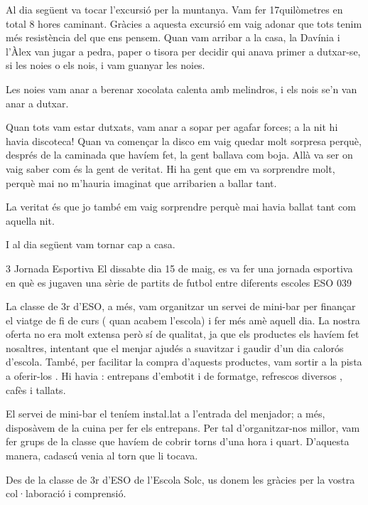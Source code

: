 \begin{news}
Al dia següent va tocar l'excursió per la muntanya. Vam fer 17quilòmetres en total 8 hores caminant. Gràcies a aquesta excursió em vaig adonar que tots tenim més resistència del que ens pensem. Quan vam arribar a la casa, la Davínia i l'Àlex van jugar a pedra, paper o tisora per decidir qui anava primer a dutxar-se, si les noies o els nois, i vam guanyar les noies. 

Les noies vam anar a berenar xocolata calenta amb melindros, i els nois se'n van anar a dutxar. 

Quan tots vam estar dutxats, vam anar a sopar per agafar forces; a la nit hi havia discoteca! Quan va començar la disco em vaig quedar molt sorpresa perquè, després de la caminada que havíem fet,  la gent ballava com boja. Allà va ser on vaig saber com és la gent de veritat. Hi ha gent que em va sorprendre molt, perquè mai no m'hauria imaginat que arribarien a ballar tant. 

La veritat és que jo també em vaig sorprendre  perquè mai havia ballat tant com aquella nit. 

I al dia següent vam tornar cap a casa.


\end{news}

\newssep
{}

\begin{news}
{3} %
{Jornada Esportiva}
{El dissabte dia 15 de maig,  es va fer una jornada esportiva en què es jugaven una sèrie de partits de futbol entre diferents escoles}
{ESO}
{039} %


La classe de 3r d’ESO, a més, vam organitzar un servei de mini-bar per finançar el viatge de fi de curs  ( quan acabem l'escola) i fer més amè aquell dia. La nostra oferta no era molt extensa però sí de qualitat, ja que els productes els havíem fet nosaltres, intentant que el menjar ajudés a suavitzar i gaudir d’un dia calorós d’escola. També, per facilitar la compra d’aquests productes, vam sortir a la pista a oferir-los . Hi havia : entrepans d'embotit i de formatge, refrescos diversos , cafès i tallats.

El servei de mini-bar el teníem instal.lat a l’entrada del menjador; a més, disposàvem de la cuina per fer els entrepans. Per tal d’organitzar-nos millor, vam fer grups de la classe que havíem de cobrir torns d’una hora i quart. D’aquesta manera, cadascú venia al torn que li tocava.

Des de la classe de 3r d’ESO de l’Escola Solc, us donem les gràcies per la vostra col·laboració i comprensió. 



\end{news}

